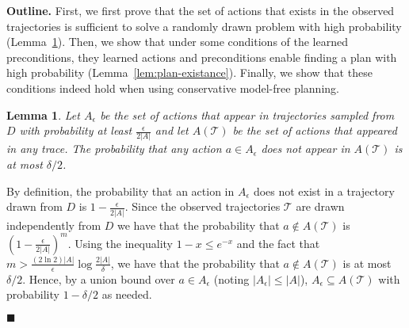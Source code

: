 \documentclass[letterpaper]{article}
\newtheorem{lemma}{Lemma}
\def\sFullBox{\hbox{\vrule width 6pt height 6pt depth 0pt}}
\newcommand{\qqed}{\(\;\;\;\sFullBox\)}
\newenvironment{proof}{\noindent{\bf Proof:~~}}{\qed}
\newenvironment{proof-of-claim}{\noindent{\bf Proof:~~}}{\qqed}
\newcommand{\qed}{\hfill\ensuremath{\blacksquare}}
\newcommand{\MEMO}[1]
{ \fbox{
\begin{minipage}[b]{7.9 cm}
#1
\end{minipage}
} }
\begin{document}
\begin{proof}
{\bf Outline.} First, we first prove that the set of actions that exists in the observed trajectories is sufficient to solve a randomly drawn problem with high probability (Lemma~\ref{lem:sufficientActions}). Then, we show that under some conditions of the learned preconditions, they learned actions and preconditions enable finding a plan with high probability (Lemma~\ref{lem:plan-existance}). Finally, we show that these conditions indeed hold when using  conservative model-free planning. 

\begin{lemma}
Let $A_\epsilon$ be the set of actions that appear in trajectories sampled from $D$ with probability at least $\frac{\epsilon}{2|A|}$ 
and let $A(\mathcal{T})$ be the set of actions that appeared in {\em any} trace. 
The probability that any action $a\in A_\epsilon$ does not appear in $A(\mathcal{T})$ is at most $\delta/2$.
\label{lem:sufficientActions}
\end{lemma}
\begin{proof-of-claim}
By definition, the probability that an action in $A_\epsilon$ does not exist in a trajectory drawn from $D$ is $1-\frac{\epsilon}{2|A|}$. Since the observed trajectories $\mathcal{T}$ are drawn independently from $D$ we have that the probability that $a\notin A(\mathcal{T})$ is $(1-\frac{\epsilon}{2|A|})^m$. 
Using the inequality $1-x\leq e^{-x}$ and 
the fact that 
$m>\frac{(2\ln 2)|A|}{\epsilon}\log\frac{2|A|}{\delta}$, we have that the probability that $a\notin A(\mathcal{T})$ is at most $\delta/2$. Hence, by a union bound over $a\in A_\epsilon$ (noting $|A_\epsilon|\leq |A|$), $A_\epsilon\subseteq A(\mathcal{T})$ with probability $1-\delta/2$ as needed.
\end{proof-of-claim}



\end{proof}
\end{document}
